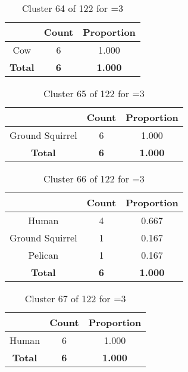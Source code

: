 \begin{table}[ht!]
\centering
\begin{tabular}{|c|c|c|}
\hline
\bf \Spec{} &\bf Count &\bf Proportion\\ \hline \hline
Cow & 6 & 1.000\\ \hline
\hline
\bf Total & \bf 6 & \bf 1.000\\ \hline
\end{tabular}
\label{tab:cluster:64:3}
\caption{Cluster 64 of 122 for \minneigh{}=3}
\end{table}

\begin{table}[ht!]
\centering
\begin{tabular}{|c|c|c|}
\hline
\bf \Spec{} &\bf Count &\bf Proportion\\ \hline \hline
Ground Squirrel & 6 & 1.000\\ \hline
\hline
\bf Total & \bf 6 & \bf 1.000\\ \hline
\end{tabular}
\label{tab:cluster:65:3}
\caption{Cluster 65 of 122 for \minneigh{}=3}
\end{table}

\begin{table}[ht!]
\centering
\begin{tabular}{|c|c|c|}
\hline
\bf \Spec{} &\bf Count &\bf Proportion\\ \hline \hline
Human & 4 & 0.667\\ \hline
Ground Squirrel & 1 & 0.167\\ \hline
Pelican & 1 & 0.167\\ \hline
\hline
\bf Total & \bf 6 & \bf 1.000\\ \hline
\end{tabular}
\label{tab:cluster:66:3}
\caption{Cluster 66 of 122 for \minneigh{}=3}
\end{table}

\begin{table}[ht!]
\centering
\begin{tabular}{|c|c|c|}
\hline
\bf \Spec{} &\bf Count &\bf Proportion\\ \hline \hline
Human & 6 & 1.000\\ \hline
\hline
\bf Total & \bf 6 & \bf 1.000\\ \hline
\end{tabular}
\label{tab:cluster:67:3}
\caption{Cluster 67 of 122 for \minneigh{}=3}
\end{table}

